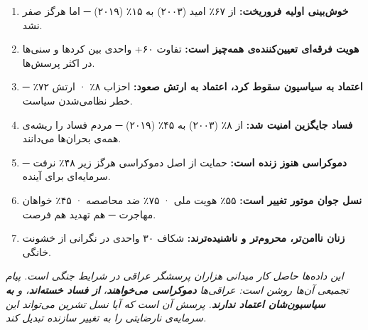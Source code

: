 \begin{tcolorbox}[
  enhanced,
  colback=gray!5,
  colframe=black!70,
  fonttitle=\bfseries\large,
  title={جمع‌بندی فصل: صدای ۲۰۰٬۰۰۰ عراقی},
  arc=3mm,
  boxrule=1pt,
]
\begin{enumerate}[rightmargin=0.5cm, itemsep=4pt]

\item \textbf{خوش‌بینی اولیه فروریخت:}
  از ۶۷٪ امید (۲۰۰۳) به ۱۵٪ (۲۰۱۹) ─ اما هرگز صفر نشد.

\item \textbf{هویت فرقه‌ای تعیین‌کننده‌ی همه‌چیز است:}
  تفاوت ۶۰+ واحدی بین کردها و سنی‌ها در اکثر پرسش‌ها.

\item \textbf{اعتماد به سیاسیون سقوط کرد، اعتماد به ارتش صعود:}
  احزاب ۸٪ · ارتش ۷۲٪ ─ خطر نظامی‌شدن سیاست.

\item \textbf{فساد جایگزین امنیت شد:}
  از ۸٪ (۲۰۰۳) به ۴۵٪ (۲۰۱۹) ─ مردم فساد را ریشه‌ی همه‌ی بحران‌ها می‌دانند.

\item \textbf{دموکراسی هنوز زنده است:}
  حمایت از اصل دموکراسی هرگز زیر ۴۸٪ نرفت ─ سرمایه‌ای برای آینده.

\item \textbf{نسل جوان موتور تغییر است:}
  ۵۵٪ هویت ملی · ۷۵٪ ضد محاصصه · ۴۵٪ خواهان مهاجرت ─
  هم تهدید هم فرصت.

\item \textbf{زنان ناامن‌تر، محروم‌تر و ناشنیده‌ترند:}
  شکاف ۳۰ واحدی در نگرانی از خشونت خانگی.

\end{enumerate}

\vspace{6pt}
\noindent
\textit{%
  این داده‌ها حاصل کار میدانی هزاران پرسشگر عراقی
  در شرایط جنگی است.
  پیام تجمیعی آن‌ها روشن است: عراقی‌ها
  \textbf{دموکراسی می‌خواهند}، \textbf{از فساد خسته‌اند}،
  و \textbf{به سیاسیون‌شان اعتماد ندارند}.
  پرسش آن است که آیا نسل تشرین می‌تواند
  این سرمایه‌ی نارضایتی را به تغییر سازنده تبدیل کند.%
}
\end{tcolorbox}